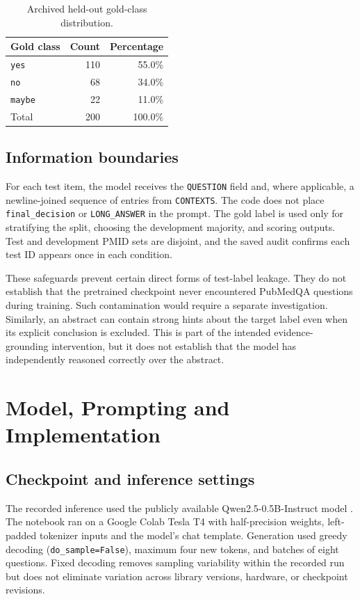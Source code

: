 \documentclass[conference]{IEEEtran}
\begin{document}
\begin{table}[t]
\centering
\caption{Archived held-out gold-class distribution.}
\label{tab:gold}
\begin{tabular}{lrr}
\toprule
Gold class & Count & Percentage \\
\midrule
\texttt{yes} & 110 & 55.0\% \\
\texttt{no} & 68 & 34.0\% \\
\texttt{maybe} & 22 & 11.0\% \\
\midrule
Total & 200 & 100.0\% \\
\bottomrule
\end{tabular}
\end{table}

\subsection{Information boundaries}
For each test item, the model receives the \texttt{QUESTION} field and, where applicable, a newline-joined sequence of entries from \texttt{CONTEXTS}. The code does not place \texttt{final\_decision} or \texttt{LONG\_ANSWER} in the prompt. The gold label is used only for stratifying the split, choosing the development majority, and scoring outputs. Test and development PMID sets are disjoint, and the saved audit confirms each test ID appears once in each condition.

These safeguards prevent certain direct forms of test-label leakage. They do not establish that the pretrained checkpoint never encountered PubMedQA questions during training. Such contamination would require a separate investigation. Similarly, an abstract can contain strong hints about the target label even when its explicit conclusion is excluded. This is part of the intended evidence-grounding intervention, but it does not establish that the model has independently reasoned correctly over the abstract.

\section{Model, Prompting and Implementation}
\subsection{Checkpoint and inference settings}
The recorded inference used the publicly available Qwen2.5-0.5B-Instruct model \cite{qwen}. The notebook ran on a Google Colab Tesla T4 with half-precision weights, left-padded tokenizer inputs and the model's chat template. Generation used greedy decoding (\texttt{do\_sample=False}), maximum four new tokens, and batches of eight questions. Fixed decoding removes sampling variability within the recorded run but does not eliminate variation across library versions, hardware, or checkpoint revisions.
\end{document}
